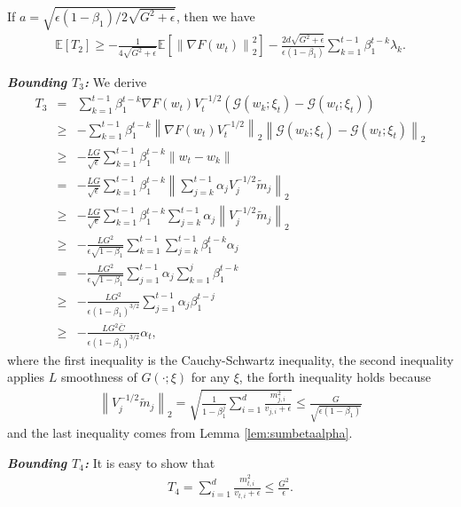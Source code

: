 \documentclass[twoside]{article}
\def\EE{\mathbb{E}}
\def\GG{\mathcal{G}}
\begin{document}
 If $a = \sqrt{\epsilon(1-\beta_1)/2\sqrt{G^2+\epsilon}}$, then we have
\begin{eqnarray}
\label{MtvT2}
\EE[T_2] \geq -\frac{1}{4\sqrt{G^2+\epsilon}}\EE\left[\left\|\nabla F(w_t)\right\|_2^2\right] - \frac{2d\sqrt{G^2+\epsilon}}{\epsilon (1-\beta_1)}\sum_{k=1}^{t-1} \beta_1^{t-k}\lambda_k.
\end{eqnarray}

\textbf{\emph{Bounding $T_3$:}} We derive
\begin{eqnarray}
T_3 
&=& \sum_{k=1}^{t-1} \beta_1^{t-k} \nabla F(w_t) V_{t}^{-1/2} \left(\GG(w_k;\xi_t)-\GG(w_t;\xi_t) \right) \nonumber \\
&\geq& -\sum_{k=1}^{t-1} \beta_1^{t-k} \left\|\nabla F(w_t) V_{t}^{-1/2}\right\|_2 \left\|\GG(w_k;\xi_t)-\GG(w_t;\xi_t)  \right\|_2 \nonumber \\
&\geq& - \frac{LG}{\sqrt{\epsilon}}\sum_{k=1}^{t-1} \beta_1^{t-k}\|w_{t}-w_k\|\nonumber\\
&=& - \frac{LG}{\sqrt{\epsilon}}\sum_{k=1}^{t-1} \beta_1^{t-k}\left\|\sum_{j=k}^{t-1} \alpha_j V_{j}^{-1/2}\tilde m_j\right\|_2\nonumber\\
&\geq& -\frac{LG}{\sqrt{\epsilon}} \sum_{k=1}^{t-1} \beta_1^{t-k}\sum_{j=k}^{t-1} \alpha_j\left\| V_j^{-1/2} \tilde m_j\right\|_2\nonumber\\
&\geq& - \frac{LG^2}{\epsilon\sqrt{1-\beta_1}} \sum_{k=1}^{t-1}\sum_{j=k}^{t-1} \beta_1^{t-k}\alpha_j\nonumber\\
&=& -\frac{LG^2}{\epsilon\sqrt{1-\beta_1}} \sum_{j=1}^{t-1} \alpha_j \sum_{k=1}^{j} \beta_1^{t-k}\nonumber\\
&\geq& -\frac{LG^2}{\epsilon(1-\beta_1)^{3/2}}\sum_{j=1}^{t-1} \alpha_j \beta_1^{t-j}\nonumber \\
&\geq& -\frac{LG^2\bar C}{\epsilon(1-\beta_1)^{3/2}}\alpha_t,\label{MtvT3}
\end{eqnarray}
where the first inequality is the Cauchy-Schwartz inequality, the second inequality applies $L$ smoothness of $G(\cdot;\xi)$ for any $\xi$, the forth inequality holds because
\begin{eqnarray}
\left\|V_j^{-1/2} \tilde m_j\right\|_2 = \sqrt{\frac{1}{1-\beta_1^j} \sum_{i=1}^d  \frac{m_{j,i}^2}{v_{j,i} + \epsilon}}\leq \frac{G}{\sqrt{\epsilon(1-\beta_1)}}\nonumber
\end{eqnarray}
and the last inequality comes from Lemma \ref{lem:sumbetaalpha}.

\textbf{\emph{Bounding $T_4$:}}
It is easy to show that
\begin{eqnarray}
\label{MtvT4}
T_4 = \sum_{i=1}^d \frac{m_{t,i}^2}{v_{t,i} + \epsilon} \leq \frac{G^2 }{\epsilon }.
\end{eqnarray}
\end{document}
